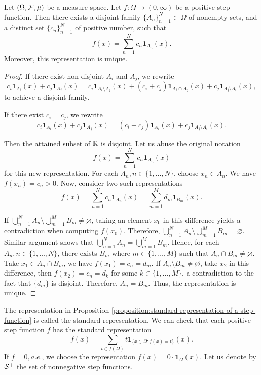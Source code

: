 \begin{proposition}
 \label{proposition:standard-representation-of-a-step-function}
 Let $(\Omega, \F, \mu)$ be a measure space. Let $f:\Omega\to(0,\infty)$ be a positive step function. Then there exists a disjoint family $\{A_n\}_{n=1}^N\subset\Omega$ of nonempty sets, and a distinct set $\{c_n\}_{n=1}^N$ of positive number, such that
 \begin{equation}
  f(x)=\sum\limits_{n=1}^Nc_n\mathbf{1}_{A_n}(x).
 \end{equation}
 Moreover, this representation is unique.
\end{proposition}
\begin{proof}
 If there exist non-disjoint $A_i$ and $A_j$, we rewrite
 $$c_i\mathbf{1}_{A_i}(x) + c_j\mathbf{1}_{A_j}(x) = c_i\mathbf{1}_{A_i\setminus A_j}(x) + (c_i+c_j)\mathbf{1}_{A_i \cap A_j}(x) + c_j\mathbf{1}_{A_j\setminus A_i}(x),$$
 to achieve a disjoint family.

 If there exist $c_i = c_j$, we rewrite
 $$c_i\mathbf{1}_{A_i}(x) + c_j\mathbf{1}_{A_j}(x) = (c_i+c_j)\mathbf{1}_{A_i}(x) + c_j\mathbf{1}_{A_j\setminus A_i}(x).$$

 Then the attained subset of $\RR$ is disjoint. Let us abuse the original notation
 $$f(x)=\sum\limits_{n=1}^N c_n\mathbf{1}_{A_n}(x)$$
 for this new representation. For each $A_n, n\in\{1,\ldots,N\}$, choose $x_n\in A_n$. We have $f(x_n) = c_n > 0$. Now, consider two such representations
 $$f(x)=\sum\limits_{n=1}^Nc_n\mathbf{1}_{A_n}(x) = \sum\limits_{m=1}^Md_m\mathbf{1}_{B_m}(x).$$

 If $\bigcup_{n=1}^N A_n\setminus \bigcup_{m=1}^M B_m \ne \varnothing$, taking an element $x_0$ in this difference yields a contradiction when computing $f(x_0)$. Therefore, $\bigcup_{n=1}^N A_n\setminus \bigcup_{m=1}^M B_m = \varnothing$. Similar argument shows that $\bigcup_{n=1}^N A_n = \bigcup_{m=1}^M B_m$. Hence, for each $A_n, n\in\{1,\ldots, N\}$, there exists $B_m$ where $m\in\{1,\ldots,M\}$ such that $A_n\cap B_m\ne \varnothing$. Take $x_1\in A_n\cap B_m$, we have $f(x_1) = c_n = d_m$. If $A_n\setminus B_m \ne \varnothing$, take $x_2$ in this difference, then $f(x_2) = c_n = d_k$ for some $k\in\{1,\ldots,M\}$, a contradiction to the fact that $\{d_m\}$ is disjoint. Therefore, $A_n = B_m$. Thus, the representation is unique.
\end{proof}
\begin{remark}
 The representation in Proposition \ref{proposition:standard-representation-of-a-step-function} is called the standard representation. We can check that each positive step function $f$ has the standard representation
 \begin{equation}
  f(x) = \sum\limits_{t\in f(\Omega)} t\mathbf{1}_{\{x\in \Omega : f(x) = t\}}(x).
 \end{equation}
 If $f = 0, a.e.$, we choose the representation $f(x) = 0\cdot \mathbf{1}_{\Omega}(x)$. Let us denote by $\S^+$ the set of nonnegative step functions.
\end{remark}

